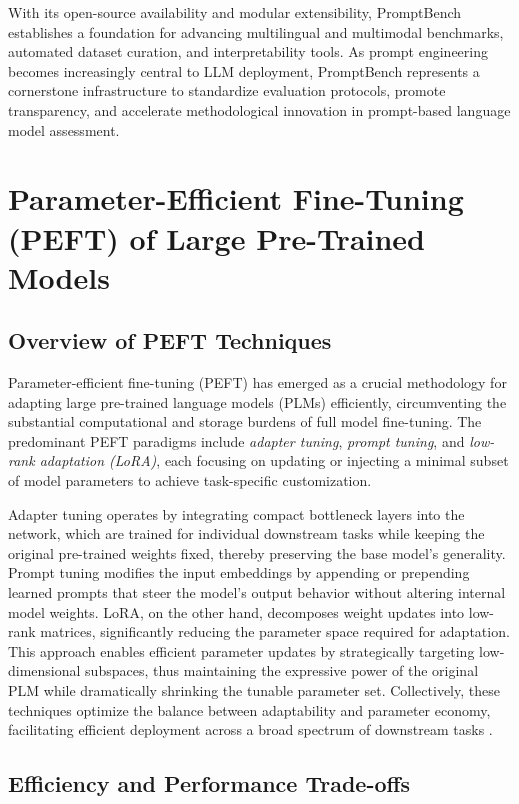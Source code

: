 With its open-source availability and modular extensibility, PromptBench establishes a foundation for advancing multilingual and multimodal benchmarks, automated dataset curation, and interpretability tools. As prompt engineering becomes increasingly central to LLM deployment, PromptBench represents a cornerstone infrastructure to standardize evaluation protocols, promote transparency, and accelerate methodological innovation in prompt-based language model assessment.

\section{Parameter-Efficient Fine-Tuning (PEFT) of Large Pre-Trained Models}

\subsection{Overview of PEFT Techniques}

Parameter-efficient fine-tuning (PEFT) has emerged as a crucial methodology for adapting large pre-trained language models (PLMs) efficiently, circumventing the substantial computational and storage burdens of full model fine-tuning. The predominant PEFT paradigms include \textit{adapter tuning}, \textit{prompt tuning}, and \textit{low-rank adaptation (LoRA)}, each focusing on updating or injecting a minimal subset of model parameters to achieve task-specific customization. 

Adapter tuning operates by integrating compact bottleneck layers into the network, which are trained for individual downstream tasks while keeping the original pre-trained weights fixed, thereby preserving the base model’s generality. Prompt tuning modifies the input embeddings by appending or prepending learned prompts that steer the model’s output behavior without altering internal model weights. LoRA, on the other hand, decomposes weight updates into low-rank matrices, significantly reducing the parameter space required for adaptation. This approach enables efficient parameter updates by strategically targeting low-dimensional subspaces, thus maintaining the expressive power of the original PLM while dramatically shrinking the tunable parameter set. Collectively, these techniques optimize the balance between adaptability and parameter economy, facilitating efficient deployment across a broad spectrum of downstream tasks \cite{ref48}.

\subsection{Efficiency and Performance Trade-offs}

